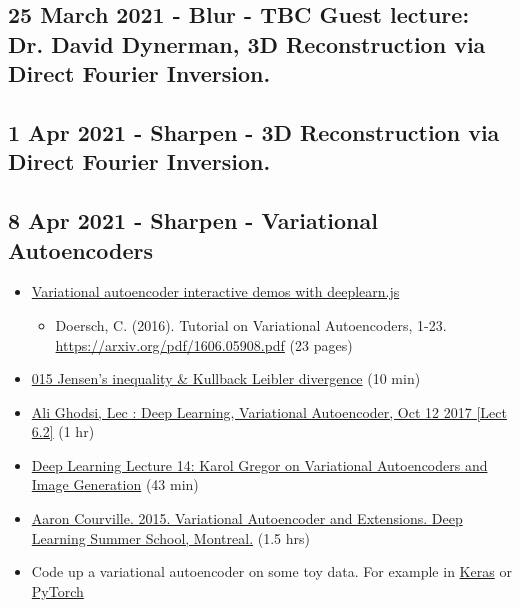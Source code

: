 \documentclass[11pt, oneside]{article}   	%
\begin{document}
\subsection{25 March 2021 - Blur - TBC Guest lecture: Dr. David Dynerman, 3D Reconstruction via Direct Fourier Inversion.}

\subsection{1 Apr 2021 - Sharpen - 3D Reconstruction via Direct Fourier Inversion.}


\pagebreak
\subsection{8 Apr 2021 - Sharpen - Variational Autoencoders }
\begin{itemize}
	\item \href{https://www.siarez.com/projects/variational-autoencoder}{Variational autoencoder interactive demos with deeplearn.js}
	\begin{itemize}
		\item Doersch, C. (2016). Tutorial on Variational Autoencoders, 1-23. \url{https://arxiv.org/pdf/1606.05908.pdf} (23 pages)
	\end{itemize}
	\item \href{https://youtu.be/_2PZxw4FzDU}{015 Jensen's inequality \& Kullback Leibler divergence} (10 min)
	\item \href{https://www.youtube.com/watch?v=uaaqyVS9-rM&feature=youtu.be}{Ali Ghodsi, Lec : Deep Learning, Variational Autoencoder, Oct 12 2017 [Lect 6.2]} (1 hr)
	\item \href{https://youtu.be/P78QYjWh5sM}{Deep Learning Lecture 14: Karol Gregor on Variational Autoencoders and Image Generation} (43 min)
	\item \href{http://videolectures.net/deeplearning2015_courville_autoencoder_extension/}{Aaron Courville. 2015. Variational Autoencoder and Extensions. Deep Learning Summer School, Montreal.} (1.5 hrs)
\end{itemize}
\begin{itemize}
	\item Code up a variational autoencoder on some toy data. For example in \href{https://tiao.io/post/tutorial-on-variational-autoencoders-with-a-concise-keras-implementation/}{Keras} or \href{https://towardsdatascience.com/variational-autoencoder-demystified-with-pytorch-implementation-3a06bee395ed}{PyTorch}
\end{itemize}
\end{document}
